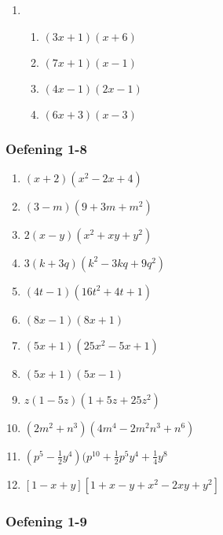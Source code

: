 {\begin{multicols}{3}
\begin{enumerate}[noitemsep, label=\textbf{\arabic*}. ]
\item %

\begin{enumerate}[noitemsep, label=\textbf{(\alph*)} ] 
\item $(3x + 1)(x + 6)$%
\item $(7x + 1)(x - 1)$%
\item $(4x - 1)(2x - 1)$%
\item $(6x + 3)(x - 3)$%
\end{enumerate}

\end{enumerate}

\subsubsection*{Oefening 1-8} %



\begin{enumerate}[noitemsep, label=\textbf{\arabic*}. ] 
\item $(x + 2)(x^2 - 2x + 4)$%
\item $(3 - m)(9 + 3m + m^2)$%
\item $2(x - y)(x^2 + xy + y^2)$%
\item $3(k + 3q)(k^2 - 3kq + 9q^2)$%
\item $(4t - 1)(16t^2 + 4t + 1)$%
\item $(8x - 1)(8x + 1)$%
\item $(5x + 1)(25x^2 - 5x + 1)$%
\item $(5x + 1)(5x - 1)$%
\item $z(1 - 5z)(1 + 5z + 25z^2)$%
\item $(2m^2 + n^3)(4m^4 - 2m^2n^3 + n^6)$%
\item $(p^5 - \frac{1}{2} y^4)(p^10 + \frac{1}{2}p^{5}y^{4} + \frac{1}{4}y^8$
\item $[1-x+y][1+x-y+x^2-2xy+y^2]$
\end{enumerate}



\subsubsection*{Oefening 1-9} %




\end{multicols}}
